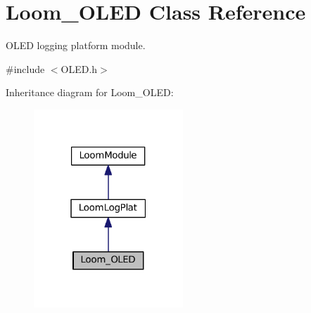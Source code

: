 \hypertarget{class_loom___o_l_e_d}{}\section{Loom\+\_\+\+O\+L\+ED Class Reference}
\label{class_loom___o_l_e_d}


O\+L\+ED logging platform module.  




{\ttfamily \#include $<$O\+L\+E\+D.\+h$>$}



Inheritance diagram for Loom\+\_\+\+O\+L\+ED\+:\nopagebreak
\begin{figure}[H]
\begin{center}
\leavevmode
\includegraphics[width=159pt]{class_loom___o_l_e_d__inherit__graph}
\end{center}
\end{figure}
